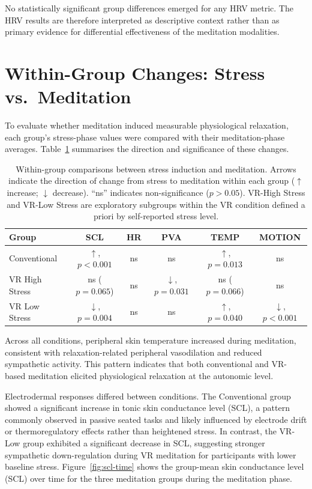No statistically significant group differences emerged for any HRV metric.
The HRV results are therefore interpreted as descriptive context rather than as primary evidence
for differential effectiveness of the meditation modalities.

\section{Within-Group Changes: Stress vs.\ Meditation}
\label{sec:within}

To evaluate whether meditation induced measurable physiological relaxation,
each group's stress-phase values were compared with their meditation-phase averages.
Table~\ref{tab:within-group} summarises the direction and significance of these changes.

\begin{table}[H]
    \centering
    \caption{Within-group comparisons between stress induction and meditation.
Arrows indicate the direction of change from stress to meditation within each group ($\uparrow$ increase; $\downarrow$ decrease).
``ns'' indicates non-significance ($p > 0.05$). VR-High Stress and VR-Low Stress are exploratory subgroups within the VR condition defined a priori by self-reported stress level.}

    \label{tab:within-group}
    \begin{tabular}{lccccc}
        \toprule
        \textbf{Group} & \textbf{SCL} & \textbf{HR} & \textbf{PVA} & \textbf{TEMP} & \textbf{MOTION} \\
        \midrule
        Conventional & $\uparrow$, $p < 0.001$  & ns & ns & $\uparrow$, $p = 0.013$ & ns \\
        VR High Stress      & ns ($p = 0.065$)         & ns & $\downarrow$, $p = 0.031$ & ns ($p = 0.066$) & ns \\
        VR Low Stress      & $\downarrow$, $p = 0.004$ & ns & ns & $\uparrow$, $p = 0.040$ & $\downarrow$, $p < 0.001$ \\
        \bottomrule
    \end{tabular}
\end{table}

Across all conditions, peripheral skin temperature increased during meditation,
consistent with relaxation-related peripheral vasodilation and reduced sympathetic activity. This pattern indicates that both conventional and VR-based meditation elicited
physiological relaxation at the autonomic level.

Electrodermal responses differed between conditions. The Conventional group showed
a significant increase in tonic skin conductance level (SCL), a pattern commonly
observed in passive seated tasks and likely influenced by electrode drift or
thermoregulatory effects rather than heightened stress. In contrast, the VR-Low
group exhibited a significant decrease in SCL, suggesting stronger sympathetic
down-regulation during VR meditation for participants with lower baseline stress. Figure~\ref{fig:scl-time} shows the group-mean skin conductance level (SCL) over time for the three meditation groups during the meditation phase.



